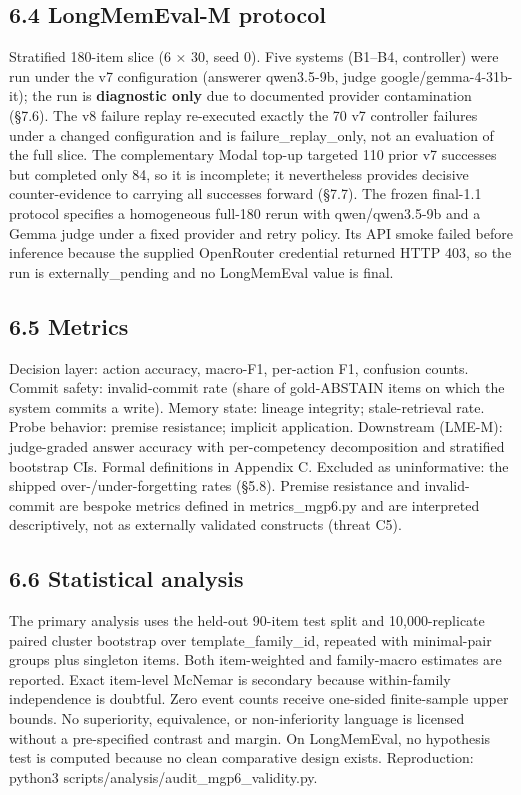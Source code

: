 \subsection{6.4 LongMemEval-M protocol}\label{longmemeval-m-protocol}

Stratified 180-item slice (6 × 30, seed 0). Five systems (B1--B4,
controller) were run under the v7 configuration (answerer qwen3.5-9b,
judge google/gemma-4-31b-it); the run is \textbf{diagnostic only} due to
documented provider contamination (§7.6). The v8 failure replay
re-executed exactly the 70 v7 controller failures under a changed
configuration and is failure\_replay\_only, not an evaluation of the
full slice. The complementary Modal top-up targeted 110 prior v7
successes but completed only 84, so it is incomplete; it nevertheless
provides decisive counter-evidence to carrying all successes forward
(§7.7). The frozen final-1.1 protocol specifies a homogeneous full-180
rerun with qwen/qwen3.5-9b and a Gemma judge under a fixed provider and
retry policy. Its API smoke failed before inference because the supplied
OpenRouter credential returned HTTP 403, so the run is
externally\_pending and no LongMemEval value is final.

\subsection{6.5 Metrics}\label{metrics}

Decision layer: action accuracy, macro-F1, per-action F1, confusion
counts. Commit safety: invalid-commit rate (share of gold-ABSTAIN items
on which the system commits a write). Memory state: lineage integrity;
stale-retrieval rate. Probe behavior: premise resistance; implicit
application. Downstream (LME-M): judge-graded answer accuracy with
per-competency decomposition and stratified bootstrap CIs. Formal
definitions in Appendix C. Excluded as uninformative: the shipped
over-/under-forgetting rates (§5.8). Premise resistance and
invalid-commit are bespoke metrics defined in metrics\_mgp6.py and are
interpreted descriptively, not as externally validated constructs
(threat C5).

\subsection{6.6 Statistical analysis}\label{statistical-analysis}

The primary analysis uses the held-out 90-item test split and
10,000-replicate paired cluster bootstrap over template\_family\_id,
repeated with minimal-pair groups plus singleton items. Both
item-weighted and family-macro estimates are reported. Exact item-level
McNemar is secondary because within-family independence is doubtful.
Zero event counts receive one-sided finite-sample upper bounds. No
superiority, equivalence, or non-inferiority language is licensed
without a pre-specified contrast and margin. On LongMemEval, no
hypothesis test is computed because no clean comparative design exists.
Reproduction: python3 scripts/analysis/audit\_mgp6\_validity.py.

